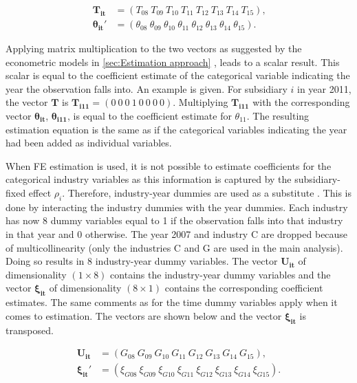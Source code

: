 \documentclass[10pt,twocolumn,oneside,cmyk]{article}
\begin{document}
\begin{equation}
 \begin{split}
  \bm{T_{it}} &=(T_{08}\ T_{09}\ T_{10}\ T_{11}\ T_{12}\ T_{13}\ T_{14}\ T_{15})\text{,}\\
  \bm{\theta_{it}'} &= (\theta_{08}\ \theta_{09}\ \theta_{10}\ \theta_{11}\ \theta_{12}\ \theta_{13}\ \theta_{14}\ \theta_{15})\text{.}
 \end{split}
\end{equation}

Applying matrix multiplication to the two vectors as suggested by the econometric models in \cref{sec:Estimation approach} \parencite[790-791]{wooldridge_introductory_2009}, leads to a scalar result. This scalar is equal to the coefficient estimate of the categorical variable indicating the year the observation falls into. An example is given. For subsidiary $i$ in year 2011, the vector $\bm T$ is $\bm{T_{i11}}=(0\ 0\ 0\ 1\ 0\ 0\ 0\ 0)$. Multiplying $\bm{T_{i11}}$ with the corresponding vector $\bm{\theta_{it}}$, $\bm{\theta_{i11}}$, is equal to the coefficient estimate for $\theta_{11}$. The resulting estimation equation is the same as if the categorical variables indicating the year had been added as individual variables.

When FE estimation is used, it is not possible to estimate coefficients for the categorical industry variables as this information is captured by the subsidiary-fixed effect $\rho_i$. Therefore, industry-year dummies are used as a substitute \parencite[for example][259]{dischinger_role_2014}. This is done by interacting the industry dummies with the year dummies. Each industry has now 8 dummy variables equal to 1 if the observation falls into that industry in that year and 0 otherwise. The year 2007 and industry C are dropped because of multicollinearity (only the industries C and G are used in the main analysis). Doing so results in 8 industry-year dummy variables. The vector $\bm{U_{it}}$ of dimensionality $(1\times8)$ contains the industry-year dummy variables and the vector $\bm{\xi_{it}}$ of dimensionality $(8\times1)$ contains the corresponding coefficient estimates. The same comments as for the time dummy variables apply when it comes to estimation. The vectors are shown below and the vector $\bm{\xi_{it}}$ is transposed.

\begin{equation}
 \begin{split}
  \bm{U_{it}} &=(G_{08}\ G_{09}\ G_{10}\ G_{11}\ G_{12}\ G_{13}\ G_{14}\ G_{15})\text{,}\\
  \bm{\xi_{it}'} &= (\xi_{G08}\ \xi_{G09}\ \xi_{G10}\ \xi_{G11}\ \xi_{G12}\ \xi_{G13}\ \xi_{G14}\ \xi_{G15})\text{.}
 \end{split}
\end{equation}
\end{document}
